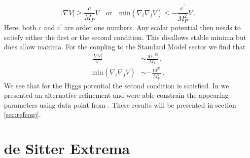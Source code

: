 \documentclass[12pt]{report}
\newcommand{\be}{\begin{equation}}
\newcommand{\ee}{\end{equation}}
\newcommand{\bea}{\begin{equation}\begin{aligned}}
\newcommand{\eea}{\end{aligned}\end{equation}}
\begin{document}
\be
|\nabla V| \geq \frac{c}{M_P} V\quad \text{or} \quad \text{min}(\nabla_i \nabla_j V) \leq - \frac{c^\prime}{M_P^2} V\,.
\label{eq:dScon}
\ee
Here, both $c$ and $c^\prime$ are order one numbers. Any scalar potential then needs to satisfy either the first or the second condition. This disallows stable minima but does allow maxima. For the coupling to the Standard Model sector we find that 
\bea 
\frac{|\nabla V|}{V} &\sim \frac{10^{-55}}{M_P}\,,\\
\text{min}(\nabla_i \nabla_j V) &\sim -\frac{10^ {35}}{M_P^ 2}\,.
\eea 
We see that for the Higgs potential the second condition is satisfied. In \cite{Andriot:2018mav} we presented an alternative refinement and were able constrain the appearing parameters using data point from \cite{Roupec:2018mbn}. These results will be presented in section \ref{sec:refconj}.

\section{de Sitter Extrema}
\label{sec:dSextrema}
\end{document}
